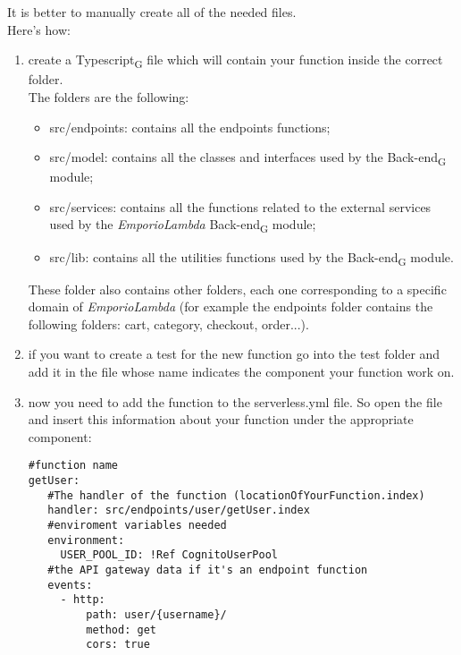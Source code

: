 It is better to manually create all of the needed files.\\
Here's how:
\begin{enumerate}
\item create a Typescript\textsubscript{G} file which will contain your function inside the correct folder.\\The folders are the following:
\begin{itemize}
\item src/endpoints: contains all the endpoints functions;
\item src/model: contains all the classes and interfaces used by the Back-end\textsubscript{G} module;
\item src/services: contains all the functions related to the external services used by the \textit{EmporioLambda} Back-end\textsubscript{G} module;
\item src/lib: contains all the utilities functions used by the Back-end\textsubscript{G} module.
\end{itemize}
These folder also contains other folders, each one corresponding to a specific domain of \textit{EmporioLambda} (for example the endpoints folder contains the following folders: cart, category, checkout, order...). 
\item if you want to create a test for the new function go into the test folder and add it in the file whose name indicates the component your function work on.
\item now you need to add the function to the serverless.yml file. So open the file and insert this information about your function under the appropriate component:
\begin{lstlisting}
#function name
getUser:
   #The handler of the function (locationOfYourFunction.index)
   handler: src/endpoints/user/getUser.index
   #enviroment variables needed
   environment:
     USER_POOL_ID: !Ref CognitoUserPool
   #the API gateway data if it's an endpoint function
   events:
     - http:
         path: user/{username}/
         method: get
         cors: true
\end{lstlisting}
\end{enumerate}